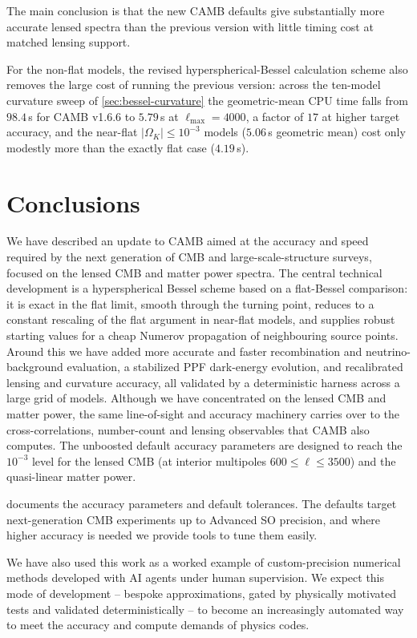 \documentclass[prd, twocolumn, superscriptaddress, tightenlines, longbibliography, nofootinbib, eqsecnum, amsfonts, amsmath, floatfix, notitlepage]{revtex4-2}
\begin{document}
The main conclusion is that the new \textsc{CAMB} defaults give substantially
more accurate lensed spectra than the previous version with little timing cost
at matched lensing support.

For the non-flat models, the revised
hyperspherical-Bessel calculation scheme also removes the large cost of running the
previous version:
across the ten-model curvature sweep of \cref{sec:bessel-curvature} the
geometric-mean CPU time falls from $98.4\,$s for \textsc{CAMB} v1.6.6 to
$5.79\,$s at $\ell_{\max}=4000$, a factor of $17$ at higher target accuracy, and
the near-flat $|\Omega_K|\le10^{-3}$ models ($5.06\,$s geometric mean) cost only
modestly more than the exactly flat case ($4.19\,$s).

\section{Conclusions}
\label{sec:summary}

We have described an update to \textsc{CAMB} aimed at the accuracy and speed
required by the next generation of CMB and large-scale-structure surveys, focused
on the lensed CMB and matter power spectra. The central technical development is a
hyperspherical Bessel scheme based on a flat-Bessel comparison: it is exact in the
flat limit, smooth through the turning point, reduces to a constant rescaling of
the flat argument in near-flat models, and supplies robust starting values for a
cheap Numerov propagation of neighbouring source points. Around this we have added
more accurate and faster recombination and neutrino-background evaluation, a stabilized PPF
dark-energy evolution, and recalibrated lensing and curvature accuracy, all
validated by a deterministic harness across a large grid of models. Although we
have concentrated on the lensed CMB and matter power, the same line-of-sight and
accuracy machinery carries over to the cross-correlations, number-count and
lensing observables that \textsc{CAMB} also computes. The unboosted default accuracy parameters are
designed to reach the $10^{-3}$ level for the lensed CMB (at interior multipoles $600 \le \ell \le 3500$) and the
quasi-linear matter power.

 documents the accuracy parameters and default tolerances. The
defaults target next-generation CMB experiments up to Advanced SO precision, and
where higher accuracy is needed we provide tools to tune them easily.

We have also used this work as a worked example of custom-precision numerical
methods developed with AI agents under human supervision. We expect this mode of
development -- bespoke approximations, gated by physically motivated tests and
validated deterministically -- to become an increasingly automated way to meet the
accuracy and compute demands of physics codes.
\end{document}
